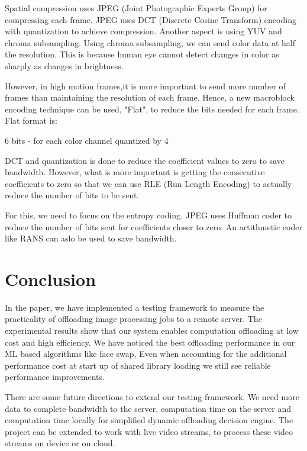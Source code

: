 \documentclass{sig-alternate}
\begin{document}
Spatial compression uses JPEG (Joint Photographic Experts Group) for compressing each frame. JPEG uses DCT (Discrete Cosine Transform) encoding with quantization to achieve compression. Another aspect is using YUV and chroma subsampling. Using chroma subsampling, we can send color data at half the resolution. This is because human eye cannot detect changes in color as sharply as changes in brightness. \cite{codec}

However, in high motion frames,it is more important to send more number of frames than maintaining the resolution of each frame. Hence, a new macroblock encoding technique can be used, "Flat", to reduce the bits needed for each frame. Flat format is:

6 bits - for each color channel quantized by 4 \cite{codec}

DCT and quantization is done to reduce the coefficient values to zero to save bandwidth. However, what is more important is getting the consecutive coefficients to zero so that we can use RLE (Run Length Encoding) to actually reduce the number of bits to be sent. \cite{codec}

For this, we need to focus on the entropy coding. JPEG uses Huffman coder to reduce the number of bits sent for coefficients closer to zero. An artithmetic coder like RANS can aslo be used to save bandwidth. \cite{codec}

\section{Conclusion}
In the paper, we have implemented a testing framework to measure the practicality of offloading image processing jobs to a remote server. The experimental results show that our system enables computation offloading at low cost and high efficiency. We have noticed the best offloading performance in our ML based algorithms like face swap, Even when accounting for the additional performance cost at start up of shared library loading we still see reliable performance improvements.

There are some future directions to extend our testing framework. We need more data to complete bandwidth to the server, computation time on the server and computation time locally for simplified dynamic offloading decision engine. The project can be extended to work with live video streams, to process these video streams on device or on cloud. 
\end{document}

